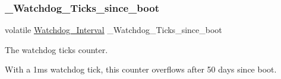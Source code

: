 \subsubsection{\texorpdfstring{\_Watchdog\_Ticks\_since\_boot}{\_Watchdog\_Ticks\_since\_boot}}
{\footnotesize\ttfamily volatile \mbox{\hyperlink{group__RTEMSScoreWatchdog_gaa1834fd7531ca9bb5c4ca6fd990388d5}{Watchdog\+\_\+\+Interval}} \+\_\+\+Watchdog\+\_\+\+Ticks\+\_\+since\+\_\+boot}



The watchdog ticks counter. 

With a 1ms watchdog tick, this counter overflows after 50 days since boot. 